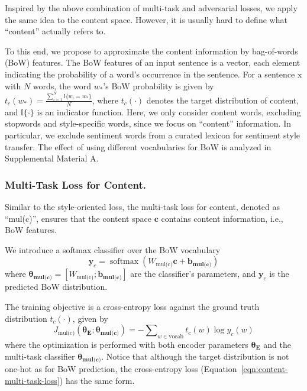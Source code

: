 \documentclass[letterpaper]{article} %
\newcommand{\rmx}{\mathrm x}
\newcommand{\loss}[1]{J_{\text{#1}}}
\newcommand{\nnweight}[1]{\bm{\theta_{\text{#1}}}}
\newcommand{\weight}[1]{W_{\text{#1}}}
\newcommand{\bias}[1]{\bm{b_{\text{#1}}}}
\begin{document}
Inspired by the above combination of multi-task and adversarial losses, we apply the same idea to the content space. However, it is usually hard to define what ``content'' actually refers to.

To this end, we propose to approximate the content information by bag-of-words (BoW) features.
The BoW features of an input sentence is a vector, each element indicating the probability of a word's occurrence in the sentence.
For a sentence $\rmx$ with $N$ words, the word $w_*$'s BoW probability is given by
$t_c(w_*)=\frac{\sum_{i=1}^{N}{\mathbb{I}\{w_i = w_*\}}}{N}$,
where $t_c(\cdot)$ denotes the target distribution of content, and $\mathbb{I\{\cdot\}}$ is an indicator function.
Here, we only consider content words, excluding stopwords and style-specific words, since we focus on ``content'' information. In particular, we exclude sentiment words from a curated lexicon \cite{hu2004mining} for sentiment style transfer.
The effect of using different vocabularies for BoW is analyzed in Supplemental Material A.

\subsubsection{Multi-Task Loss for Content.} \label{ssec:multitask-content-objective}

Similar to the style-oriented loss, the multi-task loss for content, denoted as ``mul(c)'', ensures that the content space $\bm c$ contains content information, i.e., BoW features.

We introduce a softmax classifier over the BoW vocabulary
\begin{equation} \label{eqn:bow-pred}
	\bm y_c = \operatorname{softmax}({\weight{mul(c)}} \bm c + \bias{mul(c)})
\end{equation}
where $\nnweight{mul(c)}=[\weight{mul(c)}; \bias{mul(c)}]$ are the classifier's parameters, and $\bm y_c$ is the predicted BoW distribution.

The training objective is a cross-entropy loss against the ground truth distribution $t_c(\cdot)$, given by
\begin{equation}\label{eqn:content-multi-task-loss}
	\loss{mul(c)}(\nnweight{E};\nnweight{mul(c)}) = - \sum\nolimits_{w\in\text{vocab}} t_c(w)\log y_c(w)
\end{equation}
where the optimization is performed with both encoder parameters $\nnweight{E}$ and the multi-task classifier $\nnweight{mul(c)}$.
Notice that although the target distribution is not one-hot as for BoW prediction, the cross-entropy loss (Equation~\ref{eqn:content-multi-task-loss}) has the same form.
\end{document}
